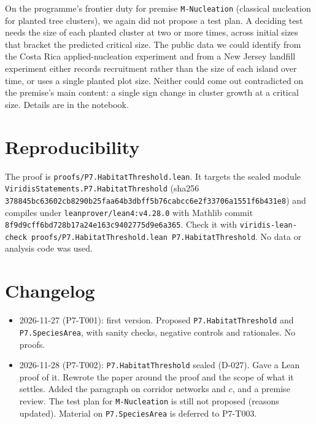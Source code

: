 \documentclass[11pt]{article}
\begin{document}
On the programme's frontier duty for premise \texttt{M-Nucleation} (classical nucleation for
planted tree clusters), we again did not propose a test plan. A deciding test needs the size of
each planted cluster at two or more times, across initial sizes that bracket the predicted
critical size. The public data we could identify from the Costa Rica applied-nucleation
experiment \citep{Zahawi2013} and from a New Jersey landfill experiment \citep{Corbin2016} either
records recruitment rather than the size of each island over time, or uses a single planted plot
size. Neither could come out contradicted on the premise's main content: a single sign change in
cluster growth at a critical size. Details are in the notebook.

\section{Reproducibility}
The proof is \texttt{proofs/P7.HabitatThreshold.lean}. It targets the sealed module
\texttt{ViridisStatements.P7.HabitatThreshold} (sha256
\texttt{378845bc63602cb8290b25faa64b3dbff5b76cabcc6e2f33706a1551f6b431e8}) and compiles under
\texttt{leanprover/lean4:v4.28.0} with Mathlib commit
\texttt{8f9d9cff6bd728b17a24e163c9402775d9e6a365}. Check it with
\texttt{viridis-lean-check proofs/P7.HabitatThreshold.lean P7.HabitatThreshold}. No data or
analysis code was used.

\section{Changelog}
\begin{itemize}
\item 2026-11-27 (P7-T001): first version. Proposed \texttt{P7.HabitatThreshold} and
\texttt{P7.SpeciesArea}, with sanity checks, negative controls and rationales. No proofs.
\item 2026-11-28 (P7-T002): \texttt{P7.HabitatThreshold} sealed (D-027). Gave a Lean proof of it.
Rewrote the paper around the proof and the scope of what it settles. Added the paragraph on
corridor networks and $c$, and a premise review. The test plan for \texttt{M-Nucleation} is still
not proposed (reasons updated). Material on \texttt{P7.SpeciesArea} is deferred to P7-T003.
\end{itemize}



\end{document}
